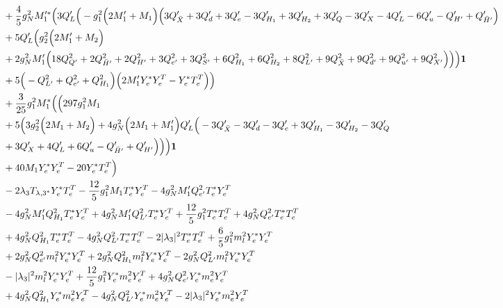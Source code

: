 {\begin{align}
 &+\frac{4}{5} g_{N}^{2} M_1'^* \Big(3 Q_L' \Big(- g_{1}^{2} \Big(2 M_1'  + M_1\Big)\Big(3 Q_{\bar{X}}'  + 3 Q_d'  + 3 Q_e'  -3 Q_{H_1}'  + 3 Q_{H_2}'  + 3 Q_Q'  -3 Q_X'  -4 Q_L'  -6 Q_u'  - Q_{H'}'  + Q_{\bar{H}'}'\Big)\nonumber \\ 
 &+5 Q_L' \Big(g_{2}^{2} \Big(2 M_1'  + M_2\Big)\nonumber \\ 
 &+2 g_{N}^{2} M_1' \Big(18 Q_{Q'}^{2}  + 2 Q_{\bar{H}'}^{2}  + 2 Q_{H'}^{2}  + 3 Q_{e'}^{2}  + 3 Q_{S'}^{2}  + 6 Q_{H_1}^{2}  + 6 Q_{H_2}^{2}  + 8 Q_{L'}^{2}  + 9 Q_{\bar{X}}^{2}  + 9 Q_{d'}^{2}  + 9 Q_{u'}^{2}  + 9 Q_{X'}^{2} \Big)\Big)\Big){\bf 1} \nonumber \\ 
 &+5 \Big(- Q_{L'}^{2}  + Q_{e'}^{2} + Q_{H_1}^{2}\Big)\Big(2 M_1' {Y_e^*  Y_{e}^{T}}  - {Y_e^*  T_{e}^{T}} \Big)\Big)\nonumber \\ 
 &+\frac{3}{25} g_{1}^{2} M_1^* \Big(\Big(297 g_{1}^{2} M_1 \nonumber \\ 
 &+5 \Big(3 g_{2}^{2} \Big(2 M_1  + M_2\Big) + 4 g_{N}^{2} \Big(2 M_1  + M_1'\Big)Q_L' \Big(-3 Q_{\bar{X}}'  -3 Q_d'  -3 Q_e'  + 3 Q_{H_1}'  -3 Q_{H_2}'  -3 Q_Q' \nonumber\\
& + 3 Q_X'  + 4 Q_L'  + 6 Q_u'  - Q_{\bar{H}'}'  + Q_{H'}'\Big)\Big)\Big){\bf 1} \nonumber \\ 
 &+40 M_1 {Y_e^*  Y_{e}^{T}} -20 {Y_e^*  T_{e}^{T}} \Big)\nonumber \\ 
 &-2 \lambda_3 T_{{\lambda,3}^*} {Y_e^*  T_{e}^{T}} -\frac{12}{5} g_{1}^{2} M_1 {T_e^*  Y_{e}^{T}} -4 g_{N}^{2} M_1' Q_{e'}^{2} {T_e^*  Y_{e}^{T}} \nonumber \\ 
 &-4 g_{N}^{2} M_1' Q_{H_1}^{2} {T_e^*  Y_{e}^{T}} +4 g_{N}^{2} M_1' Q_{L'}^{2} {T_e^*  Y_{e}^{T}} +\frac{12}{5} g_{1}^{2} {T_e^*  T_{e}^{T}} +4 g_{N}^{2} Q_{e'}^{2} {T_e^*  T_{e}^{T}} \nonumber \\ 
 &+4 g_{N}^{2} Q_{H_1}^{2} {T_e^*  T_{e}^{T}} -4 g_{N}^{2} Q_{L'}^{2} {T_e^*  T_{e}^{T}} -2 |\lambda_3|^2 {T_e^*  T_{e}^{T}} +\frac{6}{5} g_{1}^{2} {m_l^2  Y_e^*  Y_{e}^{T}} \nonumber \\ 
 &+2 g_{N}^{2} Q_{e'}^{2} {m_l^2  Y_e^*  Y_{e}^{T}} +2 g_{N}^{2} Q_{H_1}^{2} {m_l^2  Y_e^*  Y_{e}^{T}} -2 g_{N}^{2} Q_{L'}^{2} {m_l^2  Y_e^*  Y_{e}^{T}} \nonumber \\ 
 &- |\lambda_3|^2 {m_l^2  Y_e^*  Y_{e}^{T}} +\frac{12}{5} g_{1}^{2} {Y_e^*  m_e^2  Y_{e}^{T}} +4 g_{N}^{2} Q_{e'}^{2} {Y_e^*  m_e^2  Y_{e}^{T}} \nonumber \\ 
 &+4 g_{N}^{2} Q_{H_1}^{2} {Y_e^*  m_e^2  Y_{e}^{T}} -4 g_{N}^{2} Q_{L'}^{2} {Y_e^*  m_e^2  Y_{e}^{T}} -2 |\lambda_3|^2 {Y_e^*  m_e^2  Y_{e}^{T}} \nonumber \\ 

\end{align}}
